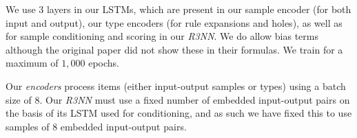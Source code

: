 \documentclass{article}
\begin{document}

We use $3$ layers in our LSTMs, which are present in our sample encoder
(for both input and output), our type encoders (for rule expansions and holes),
as well as for sample conditioning and scoring in our \emph{R3NN}.
We do allow bias terms although the original paper did not show these in their formulas.
We train for a maximum of $1,000$ epochs.

Our \emph{encoders} process items (either input-output samples or types) using a batch size of $8$.
Our \emph{R3NN} must use a fixed number of embedded input-output pairs on the basis of its LSTM used for conditioning,
and as such we have fixed this to use samples of $8$ embedded input-output pairs.
\end{document}
